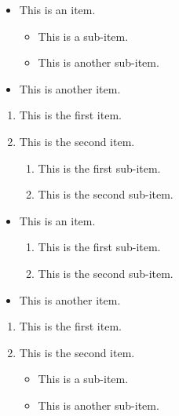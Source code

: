 \begin{itemize}
	\item This is an item.
	\begin{itemize}
		\item This is a sub-item.
		\item This is another sub-item.
	\end{itemize}
	\item This is another item.
\end{itemize}

\begin{enumerate}
	\item This is the first item.
	\item This is the second item.
	\begin{enumerate}
		\item This is the first sub-item.
		\item This is the second sub-item.
	\end{enumerate}
\end{enumerate}

\begin{itemize}
	\item This is an item.
	\begin{enumerate}
		\item This is the first sub-item.
		\item This is the second sub-item.
	\end{enumerate}
	\item This is another item.
\end{itemize}

\begin{enumerate}
	\item This is the first item.
	\item This is the second item.
	\begin{itemize}
		\item This is a sub-item.
		\item This is another sub-item.
	\end{itemize}
\end{enumerate}